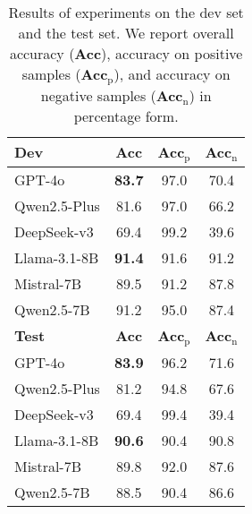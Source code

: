 \begin{table}[]
\centering
\begin{tabular}{l|ccc}
\hline
\textbf{Dev}    & \textbf{Acc}  & \textbf{Acc}$_\text{p}$ & \textbf{Acc}$_\text{n}$ \\ \hline
GPT-4o          & \textbf{83.7} & 97.0            & 70.4            \\
Qwen2.5-Plus       & 81.6          & 97.0            & 66.2            \\
DeepSeek-v3     & 69.4          & 99.2            & 39.6            \\ \hline
Llama-3.1-8B    & \textbf{91.4} & 91.6            & 91.2            \\
Mistral-7B & 89.5          & 91.2            & 87.8            \\
Qwen2.5-7B      & 91.2          & 95.0            & 87.4            \\ \hline
\textbf{Test}   & \textbf{Acc}  & \textbf{Acc}$_\text{p}$ & \textbf{Acc}$_\text{n}$ \\ \hline
GPT-4o          & \textbf{83.9} & 96.2            & 71.6            \\
Qwen2.5-Plus       & 81.2          & 94.8            & 67.6            \\
DeepSeek-v3     & 69.4          & 99.4            & 39.4            \\ \hline
Llama-3.1-8B    & \textbf{90.6} & 90.4            & 90.8            \\
Mistral-7B & 89.8          & 92.0            & 87.6            \\
Qwen2.5-7B      & 88.5          & 90.4            & 86.6            \\ \hline
\end{tabular}
\caption{\label{tab:res} Results of experiments on the dev set and the test set. We report overall accuracy (\textbf{Acc}), accuracy on positive samples (\textbf{Acc}$_{\text{p}}$), and accuracy on negative samples (\textbf{Acc}$_{\text{n}}$) in percentage form.}
\end{table}
